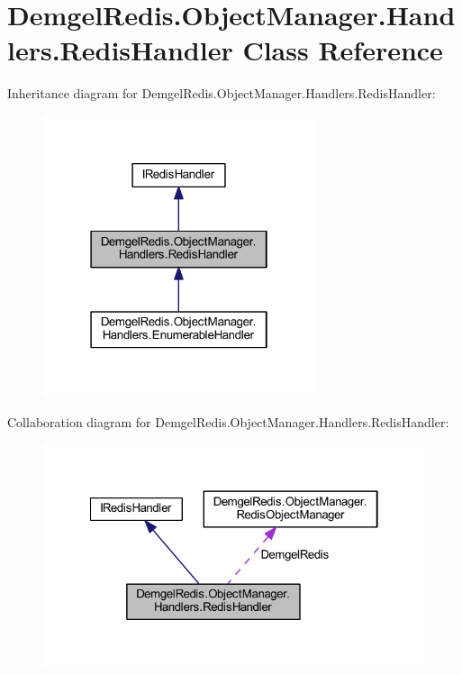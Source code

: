 \hypertarget{class_demgel_redis_1_1_object_manager_1_1_handlers_1_1_redis_handler}{}\section{Demgel\+Redis.\+Object\+Manager.\+Handlers.\+Redis\+Handler Class Reference}
\label{class_demgel_redis_1_1_object_manager_1_1_handlers_1_1_redis_handler}


Inheritance diagram for Demgel\+Redis.\+Object\+Manager.\+Handlers.\+Redis\+Handler\+:
\nopagebreak
\begin{figure}[H]
\begin{center}
\leavevmode
\includegraphics[width=226pt]{class_demgel_redis_1_1_object_manager_1_1_handlers_1_1_redis_handler__inherit__graph}
\end{center}
\end{figure}


Collaboration diagram for Demgel\+Redis.\+Object\+Manager.\+Handlers.\+Redis\+Handler\+:
\nopagebreak
\begin{figure}[H]
\begin{center}
\leavevmode
\includegraphics[width=322pt]{class_demgel_redis_1_1_object_manager_1_1_handlers_1_1_redis_handler__coll__graph}
\end{center}
\end{figure}
